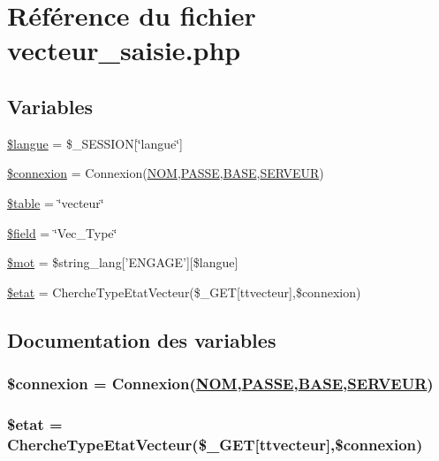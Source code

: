 \hypertarget{vecteur__saisie_8php}{
\section{R\'{e}f\'{e}rence du fichier vecteur\_\-saisie.php}
\label{vecteur__saisie_8php}
}
\subsection*{Variables}
\begin{CompactItemize}
\item 
\hyperlink{vecteur__saisie_8php_a0}{\$langue} = \$\_\-SESSION\mbox{[}\char`\"{}langue\char`\"{}\mbox{]}
\item 
\hyperlink{vecteur__saisie_8php_a1}{\$connexion} = Connexion(\hyperlink{pma__connect_8php_a0}{NOM},\hyperlink{pma__connect_8php_a1}{PASSE},\hyperlink{pma__connect_8php_a3}{BASE},\hyperlink{pma__connect_8php_a2}{SERVEUR})
\item 
\hyperlink{vecteur__saisie_8php_a2}{\$table} = \char`\"{}vecteur\char`\"{}
\item 
\hyperlink{vecteur__saisie_8php_a3}{\$field} = \char`\"{}Vec\_\-Type\char`\"{}
\item 
\hyperlink{vecteur__saisie_8php_a4}{\$mot} = \$string\_\-lang\mbox{[}'ENGAGE'\mbox{]}\mbox{[}\$langue\mbox{]}
\item 
\hyperlink{vecteur__saisie_8php_a5}{\$etat} = Cherche\-Type\-Etat\-Vecteur(\$\_\-GET\mbox{[}ttvecteur\mbox{]},\$connexion)
\end{CompactItemize}


\subsection{Documentation des variables}
\hypertarget{vecteur__saisie_8php_a1}{
\subsubsection[\$connexion]{\setlength{\rightskip}{0pt plus 5cm}\$connexion = Connexion(\hyperlink{pma__connect_8php_a0}{NOM},\hyperlink{pma__connect_8php_a1}{PASSE},\hyperlink{pma__connect_8php_a3}{BASE},\hyperlink{pma__connect_8php_a2}{SERVEUR})}}
\label{vecteur__saisie_8php_a1}


\hypertarget{vecteur__saisie_8php_a5}{
\subsubsection[\$etat]{\setlength{\rightskip}{0pt plus 5cm}\$etat = Cherche\-Type\-Etat\-Vecteur(\$\_\-GET\mbox{[}ttvecteur\mbox{]},\$connexion)}}
\label{vecteur__saisie_8php_a5}


